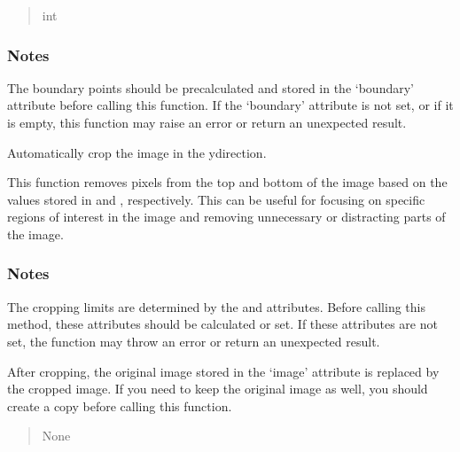\documentclass[letterpaper,10pt,english]{sphinxmanual}
\begin{document}
\begin{fulllineitems}
\begin{fulllineitems}
\begin{quote}
\begin{description}
\sphinxAtStartPar
int

\end{description}\end{quote}
\subsubsection*{Notes}

\sphinxAtStartPar
The boundary points should be pre\sphinxhyphen{}calculated and stored in the ‘boundary’ attribute before
calling this function. If the ‘boundary’ attribute is not set, or if it is empty,
this function may raise an error or return an unexpected result.

\end{fulllineitems}


\begin{fulllineitems}
\label{\detokenize{forensicfit.core.tape:forensicfit.core.tape.TapeAnalyzer.auto_crop_y}}
\pysigstartsignatures
{}
\pysigstopsignatures
\sphinxAtStartPar
Automatically crop the image in the y\sphinxhyphen{}direction.

\sphinxAtStartPar
This function removes pixels from the top and bottom of the image based on the values stored
in  and , respectively. This can be useful
for focusing on specific regions of interest in the image and removing unnecessary or
distracting parts of the image.
\subsubsection*{Notes}

\sphinxAtStartPar
The cropping limits are determined by the  and 
attributes. Before calling this method, these attributes should be calculated or set. If these
attributes are not set, the function may throw an error or return an unexpected result.

\sphinxAtStartPar
After cropping, the original image stored in the ‘image’ attribute is replaced by the cropped
image. If you need to keep the original image as well, you should create a copy before calling
this function.
\begin{quote}\begin{description}
\sphinxAtStartPar
None


\end{description}
\end{quote}
\end{fulllineitems}
\end{fulllineitems}
\end{document}
